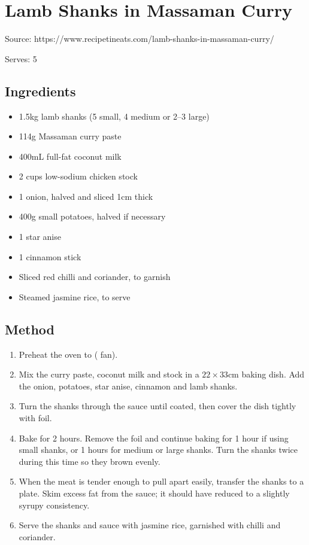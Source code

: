 \clearpage
\section{Lamb Shanks in Massaman Curry}


Source: https://www.recipetineats.com/lamb-shanks-in-massaman-curry/

Serves: 5

\subsection{Ingredients}

\begin{itemize}
    \item 1.5kg lamb shanks (5 small, 4 medium or 2--3 large)
    \item 114g Massaman curry paste
    \item 400mL full-fat coconut milk
    \item 2 cups low-sodium chicken stock
    \item 1 onion, halved and sliced 1cm thick
    \item 400g small potatoes, halved if necessary
    \item 1 star anise
    \item 1 cinnamon stick
    \item Sliced red chilli and coriander, to garnish
    \item Steamed jasmine rice, to serve
\end{itemize}

\subsection{Method}

\begin{enumerate}
    \item Preheat the oven to  ( fan).
    \item Mix the curry paste, coconut milk and stock in a $22 \times 33$cm baking dish. Add the onion, potatoes, star anise, cinnamon and lamb shanks.
    \item Turn the shanks through the sauce until coated, then cover the dish tightly with foil.
    \item Bake for 2 hours. Remove the foil and continue baking for 1 hour if using small shanks, or 1 hours for medium or large shanks. Turn the shanks twice during this time so they brown evenly.
    \item When the meat is tender enough to pull apart easily, transfer the shanks to a plate. Skim excess fat from the sauce; it should have reduced to a slightly syrupy consistency.
    \item Serve the shanks and sauce with jasmine rice, garnished with chilli and coriander.
\end{enumerate}

